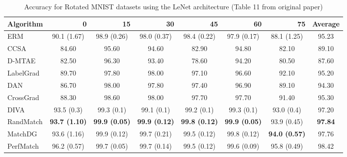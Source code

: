 \begin{table}[h]
\centering
\caption{\label{tab:table_11}Accuracy for Rotated MNIST datasets using the LeNet architecture (Table 11 from original paper)}
\begin{adjustbox}{width=\columnwidth,center}
\begin{tabular}{l|ccccccc}
\hline
Algorithm & \multicolumn{1}{r}{0} & \multicolumn{1}{r}{15} & \multicolumn{1}{r}{30} & \multicolumn{1}{r}{45} & \multicolumn{1}{r}{60} & \multicolumn{1}{r}{75} & \multicolumn{1}{l}{Average} \\ \hline
ERM       & 90.1 (1.67)           & 98.9 (0.26)            & 98.0 (0.37)            & 98.4 (0.22)            & 97.9 (0.17)            & 88.1 (1.25)            & 95.23                       \\
CCSA      & 84.60                 & 95.60                  & 94.60                  & 82.90                  & 94.80                  & 82.10                  & 89.10                       \\
D-MTAE    & 82.50                 & 96.30                  & 93.40                  & 78.60                  & 94.20                  & 80.50                  & 87.60                       \\
LabelGrad & 89.70                 & 97.80                  & 98.00                  & 97.10                  & 96.60                  & 92.10                  & 95.20                       \\
DAN       & 86.70                 & 98.00                  & 97.80                  & 97.40                  & 96.90                  & 89.10                  & 94.30                       \\
CrossGrad & 88.30                 & 98.60                  & 98.00                  & 97.70                  & 97.70                  & 91.40                  & 95.30                       \\
DIVA      & 93.5 (0.3)            & 99.3 (0.1)             & 99.1 (0.1)             & 99.2 (0.1)             & 99.3 (0.1)             & 93.0 (0.4)             & 97.20                       \\
RandMatch & \textbf{93.7 (1.10)}  & \textbf{99.9 (0.05)}   & \textbf{99.9 (0.12)}   & \textbf{99.8 (0.12)}   & \textbf{99.9 (0.05)}   & 93.9 (0.45)            & \textbf{97.84}              \\
MatchDG   & 93.6 (1.16)           & 99.9 (0.12)            & 99.7 (0.21)            & 99.5 (0.12)            & 99.8 (0.12)            & \textbf{94.0 (0.57)}   & 97.76                       \\ \hline
PerfMatch & 96.2 (0.57)           & 99.7 (0.05)            & 99.7 (0.14)            & 99.5 (0.12)            & 99.6 (0.09)            & 95.8 (0.49)            & 98.42                       \\ \hline
\end{tabular}
\end{adjustbox}
\end{table}



